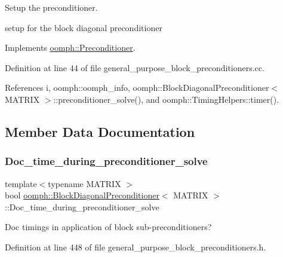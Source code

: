 Setup the preconditioner. 

setup for the block diagonal preconditioner 

Implements \hyperlink{classoomph_1_1Preconditioner_af4886f4efe510e5c9b0eb19422943588}{oomph\+::\+Preconditioner}.



Definition at line 44 of file general\+\_\+purpose\+\_\+block\+\_\+preconditioners.\+cc.



References i, oomph\+::oomph\+\_\+info, oomph\+::\+Block\+Diagonal\+Preconditioner$<$ M\+A\+T\+R\+I\+X $>$\+::preconditioner\+\_\+solve(), and oomph\+::\+Timing\+Helpers\+::timer().



\subsection{Member Data Documentation}
\mbox{\label{classoomph_1_1BlockDiagonalPreconditioner_a71c6dc36aa7c6689eb1e4767a250bc8b}} 
\subsubsection{\texorpdfstring{Doc\+\_\+time\+\_\+during\+\_\+preconditioner\+\_\+solve}{Doc\_time\_during\_preconditioner\_solve}}
{\footnotesize\ttfamily template$<$typename M\+A\+T\+R\+IX $>$ \\
bool \hyperlink{classoomph_1_1BlockDiagonalPreconditioner}{oomph\+::\+Block\+Diagonal\+Preconditioner}$<$ M\+A\+T\+R\+IX $>$\+::Doc\+\_\+time\+\_\+during\+\_\+preconditioner\+\_\+solve\hspace{0.3cm}{\ttfamily [private]}}



Doc timings in application of block sub-\/preconditioners? 



Definition at line 448 of file general\+\_\+purpose\+\_\+block\+\_\+preconditioners.\+h.

